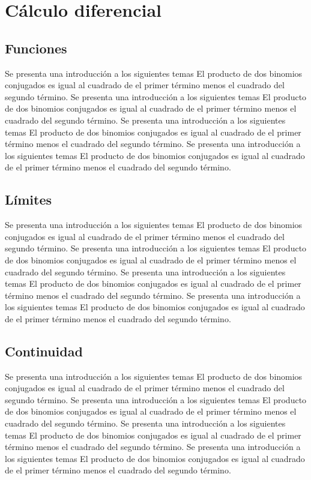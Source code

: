 \chapter{Cálculo diferencial}
\section{Funciones}
Se presenta una introducción a los siguientes temas El producto de dos binomios conjugados es igual al cuadrado de el primer término menos el cuadrado del segundo término.
Se presenta una introducción a los siguientes temas El producto de dos binomios conjugados es igual al cuadrado de el primer término menos el cuadrado del segundo término.
Se presenta una introducción a los siguientes temas El producto de dos binomios conjugados es igual al cuadrado de el primer término menos el cuadrado del segundo término.
Se presenta una introducción a los siguientes temas El producto de dos binomios conjugados es igual al cuadrado de el primer término menos el cuadrado del segundo término.

\section{Límites}
Se presenta una introducción a los siguientes temas El producto de dos binomios conjugados es igual al cuadrado de el primer término menos el cuadrado del segundo término.
Se presenta una introducción a los siguientes temas El producto de dos binomios conjugados es igual al cuadrado de el primer término menos el cuadrado del segundo término.
Se presenta una introducción a los siguientes temas El producto de dos binomios conjugados es igual al cuadrado de el primer término menos el cuadrado del segundo término.
Se presenta una introducción a los siguientes temas El producto de dos binomios conjugados es igual al cuadrado de el primer término menos el cuadrado del segundo término.

\section{Continuidad}
Se presenta una introducción a los siguientes temas El producto de dos binomios conjugados es igual al cuadrado de el primer término menos el cuadrado del segundo término.
Se presenta una introducción a los siguientes temas El producto de dos binomios conjugados es igual al cuadrado de el primer término menos el cuadrado del segundo término.
Se presenta una introducción a los siguientes temas El producto de dos binomios conjugados es igual al cuadrado de el primer término menos el cuadrado del segundo término.
Se presenta una introducción a los siguientes temas El producto de dos binomios conjugados es igual al cuadrado de el primer término menos el cuadrado del segundo término.


